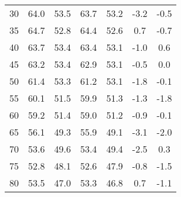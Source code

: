 \begin{longtable}{ccccccc}
    30                         & 64.0                     & 53.5                     & 63.7                       & 53.2                       & -3.2                              & -0.5                              \\
    35                         & 64.7                     & 52.8                     & 64.4                       & 52.6                       & 0.7                               & -0.7                              \\
    40                         & 63.7                     & 53.4                     & 63.4                       & 53.1                       & -1.0                              & 0.6                               \\
    45                         & 63.2                     & 53.4                     & 62.9                       & 53.1                       & -0.5                              & 0.0                               \\
    50                         & 61.4                     & 53.3                     & 61.2                       & 53.1                       & -1.8                              & -0.1                              \\
    55                         & 60.1                     & 51.5                     & 59.9                       & 51.3                       & -1.3                              & -1.8                              \\
    60                         & 59.2                     & 51.4                     & 59.0                       & 51.2                       & -0.9                              & -0.1                              \\
    65                         & 56.1                     & 49.3                     & 55.9                       & 49.1                       & -3.1                              & -2.0                              \\
    70                         & 53.6                     & 49.6                     & 53.4                       & 49.4                       & -2.5                              & 0.3                               \\
    75                         & 52.8                     & 48.1                     & 52.6                       & 47.9                       & -0.8                              & -1.5                              \\
    80                         & 53.5                     & 47.0                     & 53.3                       & 46.8                       & 0.7                               & -1.1                              \\

\end{longtable}

